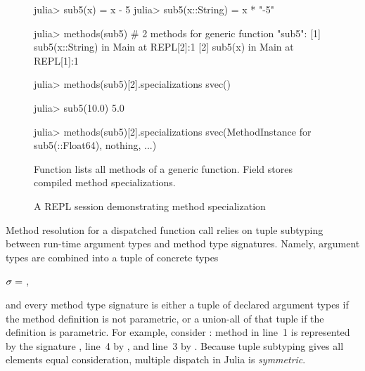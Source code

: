 \begin{figure}[t]
\centering
\begin{minipage}{10cm}
\begin{julia}
julia> sub5(x) = x - 5
julia> sub5(x::String) = x * "-5"

julia> methods(sub5)
# 2 methods for generic function "sub5":
[1] sub5(x::String) in Main at REPL[2]:1
[2] sub5(x) in Main at REPL[1]:1

julia> methods(sub5)[2].specializations
svec()

julia> sub5(10.0)
5.0

julia> methods(sub5)[2].specializations
svec(MethodInstance for sub5(::Float64), nothing, ...)
\end{julia}
\end{minipage}
\caption{A REPL session demonstrating method specialization
}\label{fig:code:specializations}
\begin{tablenotes}[para]
\small
Function  lists all methods of a generic function.
Field  stores compiled method specializations.
\end{tablenotes}
\end{figure}

Method resolution for a dispatched function call 
relies on tuple subtyping~\cite{bib:leavens:tuple-dispatch:1998}
between run-time argument types and method type signatures.
Namely, argument types are combined into a tuple of concrete types
\begin{center}
  $\sigma =$ ,
\end{center}
and every method type signature is either a tuple of declared argument types
if the method definition is not parametric, or a union-all of that tuple
if the definition is parametric.
For example, consider : method in line~1
is represented by the signature , line~4 by
, and line~3 by
.
Because tuple subtyping gives all elements equal consideration,
multiple dispatch in Julia is \emph{symmetric}.

